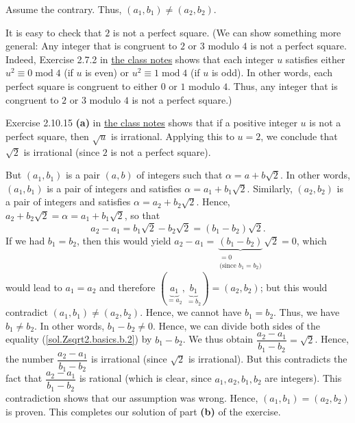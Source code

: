 \documentclass[paper=a4, fontsize=12pt]{scrartcl}%
\theoremstyle{plainsl}
\theoremstyle{definition}
\theoremstyle{remark}
\begin{document}
Assume the contrary. Thus, $\left(  a_{1},b_{1}\right)  \neq\left(
a_{2},b_{2}\right)  $.

It is easy to check that $2$ is not a perfect square. (We can show something
more general: Any integer that is congruent to $2$ or $3$ modulo $4$ is not a
perfect square. Indeed, Exercise 2.7.2 in
\href{http://www.cip.ifi.lmu.de/~grinberg/t/19s/notes.pdf}{the class notes}
shows that each integer $u$ satisfies either $u^{2}\equiv0\operatorname{mod}4$
(if $u$ is even) or $u^{2}\equiv1\operatorname{mod}4$ (if $u$ is odd). In
other words, each perfect square is congruent to either $0$ or $1$ modulo $4$.
Thus, any integer that is congruent to $2$ or $3$ modulo $4$ is not a perfect square.)

Exercise 2.10.15 \textbf{(a)} in
\href{http://www.cip.ifi.lmu.de/~grinberg/t/19s/notes.pdf}{the class notes}
shows that if a positive integer $u$ is not a perfect square, then $\sqrt{u}$
is irrational. Applying this to $u=2$, we conclude that $\sqrt{2}$ is
irrational (since $2$ is not a perfect square).

But $\left(  a_{1},b_{1}\right)  $ is a pair $\left(  a,b\right)  $ of
integers such that $\alpha=a+b\sqrt{2}$. In other words, $\left(  a_{1}%
,b_{1}\right)  $ is a pair of integers and satisfies $\alpha=a_{1}+b_{1}%
\sqrt{2}$. Similarly, $\left(  a_{2},b_{2}\right)  $ is a pair of integers and
satisfies $\alpha=a_{2}+b_{2}\sqrt{2}$. Hence, $a_{2}+b_{2}\sqrt{2}%
=\alpha=a_{1}+b_{1}\sqrt{2}$, so that%
\begin{equation}
a_{2}-a_{1}=b_{1}\sqrt{2}-b_{2}\sqrt{2}=\left(  b_{1}-b_{2}\right)  \sqrt{2}.
\label{sol.Zsqrt2.basics.b.2}%
\end{equation}
If we had $b_{1}=b_{2}$, then this would yield $a_{2}-a_{1}%
=\underbrace{\left(  b_{1}-b_{2}\right)  }_{\substack{=0\\\text{(since }%
b_{1}=b_{2}\text{)}}}\sqrt{2}=0$, which would lead to $a_{1}=a_{2}$ and
therefore $\left(  \underbrace{a_{1}}_{=a_{2}},\underbrace{b_{1}}_{=b_{2}%
}\right)  =\left(  a_{2},b_{2}\right)  $; but this would contradict $\left(
a_{1},b_{1}\right)  \neq\left(  a_{2},b_{2}\right)  $. Hence, we cannot have
$b_{1}=b_{2}$. Thus, we have $b_{1}\neq b_{2}$. In other words, $b_{1}%
-b_{2}\neq0$. Hence, we can divide both sides of the equality
(\ref{sol.Zsqrt2.basics.b.2}) by $b_{1}-b_{2}$. We thus obtain $\dfrac
{a_{2}-a_{1}}{b_{1}-b_{2}}=\sqrt{2}$. Hence, the number $\dfrac{a_{2}-a_{1}%
}{b_{1}-b_{2}}$ is irrational (since $\sqrt{2}$ is irrational). But this
contradicts the fact that $\dfrac{a_{2}-a_{1}}{b_{1}-b_{2}}$ is rational
(which is clear, since $a_{1},a_{2},b_{1},b_{2}$ are integers). This
contradiction shows that our assumption was wrong. Hence, $\left(  a_{1}%
,b_{1}\right)  =\left(  a_{2},b_{2}\right)  $ is proven. This completes our
solution of part \textbf{(b)} of the exercise.\\[0.4cm]
\end{document}
